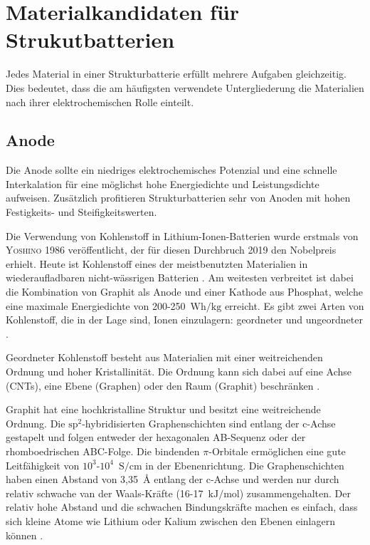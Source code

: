 \section{Materialkandidaten für Strukutbatterien}

Jedes Material in einer Strukturbatterie erfüllt mehrere Aufgaben gleichzeitig. Dies bedeutet, dass 
die am häufigsten verwendete Untergliederung die Materialien nach ihrer elektrochemischen Rolle einteilt.


\subsection{Anode}
Die Anode sollte ein niedriges elektrochemisches Potenzial und eine schnelle Interkalation für eine möglichst hohe Energiedichte und Leistungsdichte aufweisen. Zusätzlich profitieren Strukturbatterien sehr von Anoden mit hohen Festigkeits- und Steifigkeitswerten.

Die Verwendung von Kohlenstoff in Lithium-Ionen-Batterien wurde erstmals von \textsc{Yoshino} \cite{Yoshino1986} 1986 veröffentlicht, der für diesen Durchbruch 2019 den Nobelpreis erhielt.
Heute ist Kohlenstoff eines der meistbenutzten Materialien in wiederaufladbaren nicht-wässrigen Batterien \cite{Ahmad2021}. Am weitesten verbreitet ist dabei die Kombination von Graphit als Anode und einer Kathode aus Phosphat, welche eine maximale Energiedichte von 200-250~$\si{\watt \hour \per \kg}$ erreicht. 
Es gibt zwei Arten von Kohlenstoff, die in der Lage sind, Ionen einzulagern: geordneter und ungeordneter \cite{Ghosh2024}.

Geordneter Kohlenstoff besteht aus Materialien mit einer weitreichenden Ordnung und hoher Kristallinität. Die Ordnung kann sich dabei auf eine Achse (CNTs), eine Ebene (Graphen) oder den Raum (Graphit) beschränken \cite{Wang2021}.

Graphit hat eine hochkristalline Struktur und besitzt eine weitreichende Ordnung. Die $\text{sp}^\text{2}$-hybridisierten Graphenschichten sind entlang der c-Achse gestapelt und folgen entweder der hexagonalen AB-Sequenz oder der rhomboedrischen ABC-Folge. Die bindenden $\pi$-Orbitale ermöglichen eine gute Leitfähigkeit von $10^3$-$10^4$~$\si{\siemens \per \cm}$ in der Ebenenrichtung. Die Graphenschichten haben einen Abstand von 3,35~$\si{\angstrom}$ entlang der c-Achse und werden nur durch relativ schwache van der Waals-Kräfte (16-17~$\si{\kJ \per \mol}$) zusammengehalten. Der relativ hohe Abstand und die schwachen Bindungskräfte machen es einfach, dass sich kleine Atome wie Lithium oder Kalium zwischen den Ebenen einlagern können \cite{Wang2021}.

